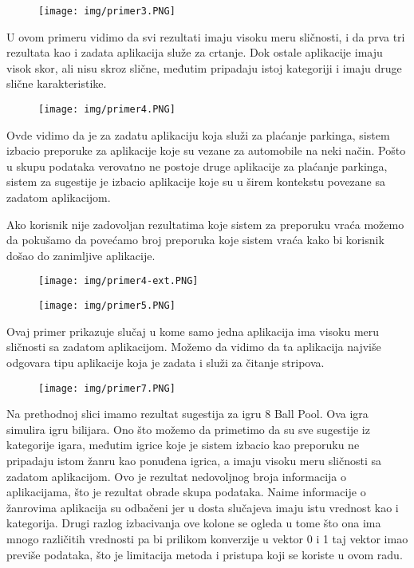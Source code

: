 \documentclass[a4paper,12pt,titlepage]{article}
\begin{document}
\begin{figure}[ht!]
\centering
\texttt{[image: img/primer3.PNG]}
\label{Input1}
\end{figure}

U ovom primeru vidimo da svi rezultati imaju visoku meru sličnosti, i da prva tri rezultata kao i zadata aplikacija služe za crtanje. Dok ostale aplikacije imaju visok skor, ali nisu skroz slične, međutim pripadaju istoj kategoriji i imaju druge slične karakteristike. 

\newpage

\begin{figure}[ht!]
\centering
\texttt{[image: img/primer4.PNG]}
\label{Input1}
\end{figure}

Ovde vidimo da je za zadatu aplikaciju koja služi za plaćanje parkinga, sistem izbacio preporuke za aplikacije koje su vezane za automobile na neki način. Pošto u skupu podataka verovatno ne postoje druge aplikacije za plaćanje parkinga, sistem za sugestije je izbacio aplikacije koje su u širem kontekstu povezane sa zadatom aplikacijom. 

Ako korisnik nije zadovoljan rezultatima koje sistem za preporuku vraća možemo da pokušamo da povećamo broj preporuka koje sistem vraća kako bi korisnik došao do zanimljive aplikacije. 

\begin{figure}[ht!]
\centering
\texttt{[image: img/primer4-ext.PNG]}
\label{Input1}
\end{figure}

\newpage

\begin{figure}[ht!]
\centering
\texttt{[image: img/primer5.PNG]}
\label{Input1}
\end{figure}

Ovaj primer prikazuje slučaj u kome samo jedna aplikacija ima visoku meru sličnosti sa zadatom aplikacijom. Možemo da vidimo da ta aplikacija najviše odgovara tipu aplikacije koja je zadata i služi za čitanje stripova.

\begin{figure}[ht!]
\centering
\texttt{[image: img/primer7.PNG]}
\label{Input1}
\end{figure}

Na prethodnoj slici imamo rezultat sugestija za igru 8 Ball Pool. Ova igra simulira igru bilijara. Ono što možemo da primetimo da su sve sugestije iz kategorije igara, međutim igrice koje je sistem izbacio kao preporuku ne pripadaju istom žanru kao ponuđena igrica, a imaju visoku meru sličnosti sa zadatom aplikacijom. Ovo je rezultat nedovoljnog broja informacija o aplikacijama, što je rezultat obrade skupa podataka. Naime informacije o žanrovima aplikacija su odbačeni jer u dosta slučajeva imaju istu vrednost kao i kategorija. Drugi razlog izbacivanja ove kolone se ogleda u tome što ona ima mnogo različitih vrednosti pa bi prilikom konverzije u vektor 0 i 1 taj vektor imao previše podataka, što je limitacija metoda i pristupa koji se koriste u ovom radu.
\end{document}

